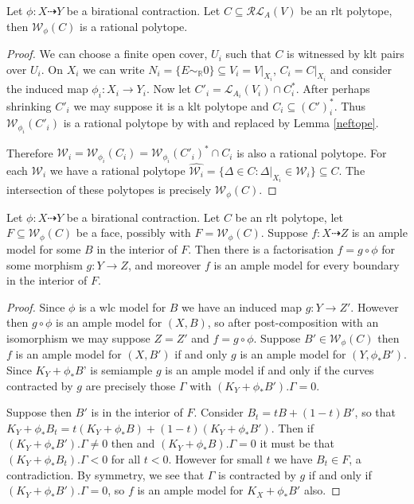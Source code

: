 	\begin{lemma}\label{rationality}
		Let $\phi: X \dashrightarrow Y$ be a birational contraction. Let $C \subseteq \mathcal{RL}_{A}(V)$ be an rlt polytope, then $\mathcal{W}_{\phi}(C)$ is a rational polytope.
	\end{lemma}
	\begin{proof}
		We can choose a finite open cover, $U_{i}$ such that $C$ is witnessed by klt pairs over $U_{i}$. On $X_{i}$ we can write $N_{i}=\{E\sim_{\mathbb{R}} 0\} \subseteq V_{i}=V|_{X_{i}}$, $C_{i}=C|_{X_{i}}$ and consider the induced map $\phi_{i}:X_{i} \to Y_{i}$. Now let $C'_{i}=\mathcal{L}_{A_{i}}(V_{i}) \cap C_{i}^{*}$. After perhaps shrinking $C'_{i}$ we may suppose it is a klt polytope and $C_{i} \subseteq (C')^{*}_{i}$. Thus $\mathcal{W}_{\phi_{i}}(C'_{i})$ is a rational polytope by \cite[Corollary 3.11.2]{birkar2010existence} with \cite[Theorem 3.11.1]{birkar2010existence} and \cite[Lemma 3.7.4]{birkar2010existence} replaced by Lemma \ref{neftope}.
		
		Therefore $\mathcal{W}_{i}=\mathcal{W}_{\phi_{i}}(C_{i})=\mathcal{W}_{\phi_{i}}(C'_{i})^{*}\cap C_{i}$ is also a rational polytope. For each $\mathcal{W}_{i}$ we have a rational polytope $\hat{\mathcal{W}_{i}}=\{\Delta \in C: \Delta|_{X_{i}} \in \mathcal{W}_{i}\} \subseteq C$. The intersection of these polytopes is precisely $\mathcal{W}_{\phi}(C)$.
	\end{proof}
	
	\begin{lemma}\label{faces}
		Let $\phi: X \dashrightarrow Y$ be a birational contraction. Let $C$ be an rlt polytope, let $F \subseteq \mathcal{W}_{\phi}(C)$ be a face, possibly with $F =\mathcal{W}_{\phi}(C)$. Suppose $f: X \dashrightarrow Z$ is an ample model for some $B$ in the interior of $F$. Then there is a factorisation $f=g \circ \phi$ for some morphism $g:Y \to Z$, and moreover $f$ is an ample model for every boundary in the interior of $F$.
	\end{lemma}
	
	\begin{proof}
		
		Since $\phi$ is a wlc model for $B$ we have an induced map $g: Y \to Z'$. However then $g\circ \phi$ is an ample model for $(X,B)$, so after post-composition with an isomorphism we may suppose $Z=Z'$ and $f=g\circ \phi$. Suppose $B' \in \mathcal{W}_{\phi}(C)$ then $f$ is an ample model for $(X,B')$ if and only $g$ is an ample model for $(Y,\phi_{*}B')$. Since $K_{Y}+\phi_{*}B$' is semiample $g$ is an ample model if and only if the curves contracted by $g$ are precisely those $\Gamma$ with $(K_{Y}+\phi_{*}B').\Gamma=0$.
		
		Suppose then $B'$ is in the interior of $F$. Consider $B_{t}=tB+(1-t)B'$, so that $K_{Y}+\phi_{*}B_{t}= t(K_{Y}+\phi_{*}B)+(1-t)(K_{Y}+\phi_{*}B')$. Then if $(K_{Y}+\phi_{*}B').\Gamma \neq 0$ then and $(K_{Y}+\phi_{*}B).\Gamma=0$ it must be that $(K_{Y}+\phi_{*}B_{t}).\Gamma < 0$ for all $t < 0$. However for small $t$ we have $B_{t} \in F$, a contradiction. By symmetry, we see that $\Gamma$ is contracted by $g$ if and only if $(K_{Y}+\phi_{*}B').\Gamma=0$, so $f$ is an ample model for $K_{X}+\phi_{*}B'$ also.
	\end{proof} 


